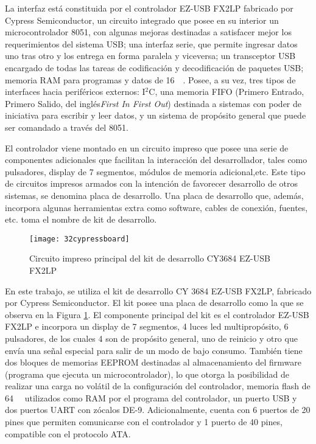 La interfaz está constituida por el controlador EZ-USB FX2LP fabricado por Cypress Semiconductor, un circuito integrado que posee en su interior un microcontrolador 8051, con algunas mejoras destinadas a satisfacer mejor los requerimientos del sistema USB; una interfaz serie, que permite ingresar datos uno tras otro y los entrega en forma paralela y viceversa; un transceptor USB encargado de todas las tareas de codificación y decodificación de paquetes USB; memoria RAM para programas y datos de \SI{16}{\kilo\byte}. Posee, a su vez, tres tipos de interfaces hacia periféricos externos: I$^2$C, una memoria FIFO (Primero Entrado, Primero Salido, del inglés{\it First In First Out}) destinada a sistemas con poder de iniciativa para escribir y leer datos, y un sistema de propósito general que puede ser comandado a través del 8051\cite{CypressSemiconductor2014fx2lp}.%

El controlador viene montado en un circuito impreso que posee una serie de componentes adicionales que facilitan la interacción del desarrollador, tales como pulsadores, display de 7 segmentos, módulos de memoria adicional,etc. Este tipo de circuitos impresos armados con la intención de favorecer desarrollo de otros sistemas, se denomina placa de desarrollo. Una placa de desarrollo que, además, incorpora algunas herramientas extra como software, cables de conexión, fuentes, etc. toma el nombre de kit de desarrollo.%

\begin{figure}
\centering
\texttt{[image: 32cypressboard]}
\caption{Circuito impreso principal del kit de desarrollo CY3684 EZ-USB FX2LP}
\label{fig:cy3684}
\end{figure}

En este trabajo, se utiliza el kit de desarrollo CY 3684 EZ-USB FX2LP, fabricado por Cypress Semiconductor\cite{CypressSemiconductor2014cy3684}. El kit posee una placa de desarrollo como la que se observa en la Figura \ref{fig:cy3684}. El componente principal del kit es el controlador EZ-USB FX2LP e incorpora un display de 7 segmentos, 4 luces led multipropósito, 6 pulsadores, de los cuales 4 son de propósito general, uno de reinicio y otro que envía una señal especial para salir de un modo de bajo consumo. También tiene dos bloques de memorias EEPROM destinadas al almacenamiento del firmware (programa que ejecuta un microcontrolador), lo que otorga la posibilidad de realizar una carga no volátil de la configuración del controlador, memoria flash de \SI{64}{\kilo\byte} utilizados como RAM por el programa del controlador, un puerto USB y dos puertos UART con zócalos DE-9. Adicionalmente, cuenta con 6 puertos de 20 pines que permiten comunicarse con el controlador y 1 puerto de 40 pines, compatible con el protocolo ATA.%

